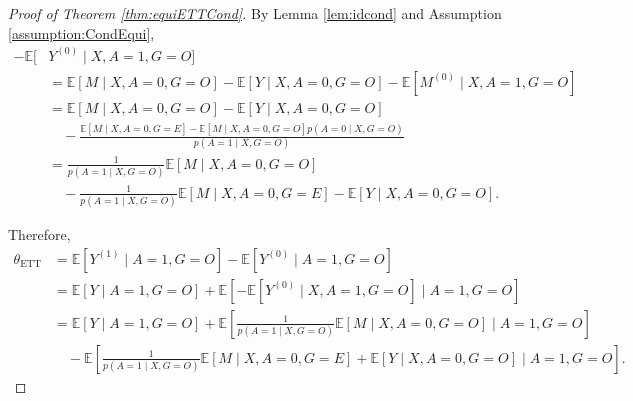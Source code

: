 \documentclass[10pt]{article}
\newcommand{\E}{\mathbb{E}}
\begin{document}
\begin{proof}[Proof of Theorem \ref{thm:equiETTCond}]
	
By Lemma \ref{lem:idcond} and Assumption \ref{assumption:CondEqui}, 
\begin{align*}
-\E[&Y^{(0)}\mid  X,A=1,G=O]\\
&=\E[M\mid X,A=0,G=O]
-\E[Y\mid  X,A=0,G=O]
-\E[M^{(0)}\mid  X,A=1,G=O]\\
&=\E[M\mid X,A=0,G=O]
-\E[Y\mid  X,A=0,G=O]\\
&\quad-\frac{\E[M\mid X,A=0,G=E]-\E[M\mid X,A=0, G=O]p(A=0\mid X,G=O)}{p(A=1\mid X,G=O)}\\
&=\frac{1}{p(A=1\mid X,G=O)}\E[M\mid X,A=0,G=O]\\
&\quad-\frac{1}{p(A=1\mid X,G=O)}\E[M\mid X,A=0,G=E]-\E[Y\mid  X,A=0,G=O].
\end{align*}

Therefore,
\begin{align*}
\theta_{\text{ETT}}
&=\E[Y^{(1)}\mid A=1,G=O]-\E[Y^{(0)}\mid A=1,G=O]\\
&=\E[Y\mid A=1,G=O]+\E[-\E[Y^{(0)}\mid X,A=1,G=O]\mid A=1,G=O]\\
&=\E[Y\mid A=1,G=O]
+\E[\frac{1}{p(A=1\mid X,G=O)}\E[M\mid X,A=0,G=O]\mid A=1,G=O]\\
&\quad-\E[\frac{1}{p(A=1\mid X,G=O)}\E[M\mid X,A=0,G=E]+\E[Y\mid  X,A=0,G=O]\mid A=1,G=O].
\end{align*}


	
\end{proof}
\end{document}
